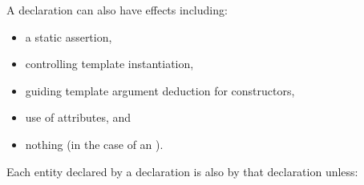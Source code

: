 \begin{note}
A declaration can also have effects including:
\begin{itemize}
\item a static assertion,
\item controlling template instantiation,
\item guiding template argument deduction for constructors,
\item use of attributes, and
\item nothing (in the case of an ).
\end{itemize}
\end{note}

\pnum
{}%
%
Each entity declared by a declaration is
also  by that declaration unless:
